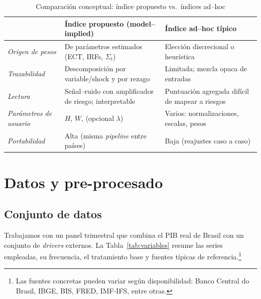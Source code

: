 \documentclass[11pt,a4paper]{article}
\newcommand{\1}{\mathbf{1}}
\begin{document}
\begin{table}[h!]
\centering
\caption{Comparación conceptual: índice propuesto vs.\ índices ad--hoc}
\begin{tabular}{@{}p{4cm}p{5.2cm}p{5.2cm}@{}}
\toprule
 & \textbf{Índice propuesto (model--implied)} & \textbf{Índice ad--hoc típico} \\
\midrule
\textit{Origen de pesos} & De parámetros estimados (ECT, IRFs, \(\Sigma_t\)) & Elección discrecional o heurística \\
\textit{Trazabilidad} & Descomposición por variable/shock y por rezago & Limitada; mezcla opaca de entradas \\
\textit{Lectura} & Señal--ruido con amplificador de riesgo; interpretable & Puntuación agregada difícil de mapear a riesgos \\
\textit{Parámetros de usuario} & $H$, $W$, (opcional $\lambda$) & Varios: normalizaciones, escalas, pesos \\
\textit{Portabilidad} & Alta (misma \emph{pipeline} entre países) & Baja (reajustes caso a caso) \\
\bottomrule
\end{tabular}
\end{table}

\section{Datos y pre-procesado}

\subsection{Conjunto de datos}

Trabajamos con un panel trimestral que combina el PIB real de Brasil con un conjunto de \emph{drivers} externos. La Tabla~\ref{tab:variables} resume las series empleadas, su frecuencia, el tratamiento base y fuentes típicas de referencia.\footnote{Las fuentes concretas pueden variar según disponibilidad: Banco Central do Brasil, IBGE, BIS, FRED, IMF-IFS, entre otras.}
\end{document}
